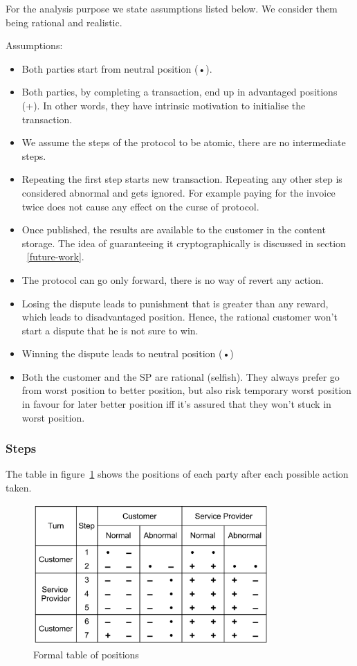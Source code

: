 \documentclass{ieeeaccess}
\begin{document}
For the analysis purpose we state assumptions listed below. We consider
them being rational and realistic.

Assumptions:

\begin{itemize}

\item
  Both parties start from neutral position (•).
\item
  Both parties, by completing a transaction, end up in advantaged
  positions (+). In other words, they have intrinsic motivation to
  initialise the transaction.
\item
  We assume the steps of the protocol to be atomic, there are no
  intermediate steps.
\item
  Repeating the first step starts new transaction. Repeating any other
  step is considered abnormal and gets ignored. For example paying for
  the invoice twice does not cause any effect on the curse of protocol.
\item
  Once published, the results are available to the customer in the
  content storage. The idea of guaranteeing it cryptographically is
  discussed in section ~\ref{future-work}.
\item
  The protocol can go only forward, there is no way of revert any
  action.
\item
  Losing the dispute leads to punishment that is greater than any
  reward, which leads to disadvantaged position. Hence, the rational
  customer won't start a dispute that he is not sure to win.
\item
  Winning the dispute leads to neutral position (•)
\item
  Both the customer and the SP are rational (selfish). They always
  prefer go from worst position to better position, but also risk
  temporary worst position in favour for later better position iff it's
  assured that they won't stuck in worst position.
\end{itemize}

\subsubsection{Steps}\label{steps}

The table in figure~\ref{fig:positions} shows the positions of each party after each possible
action taken.

\begin{figure}[h!]
\includegraphics[width=9cm]{formal-table-of-positions.png}
\centering
\caption{Formal table of positions}
\label{fig:positions}
\end{figure}
\end{document}

